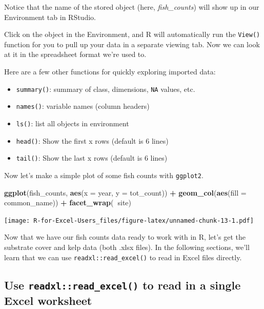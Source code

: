 \documentclass[]{book}
\newenvironment{Shaded}{\begin{snugshade}}{\end{snugshade}}
\newcommand{\DataTypeTok}[1]{\textcolor[rgb]{0.13,0.29,0.53}{#1}}
\newcommand{\KeywordTok}[1]{\textcolor[rgb]{0.13,0.29,0.53}{\textbf{#1}}}
\newcommand{\NormalTok}[1]{#1}
\newcommand{\OperatorTok}[1]{\textcolor[rgb]{0.81,0.36,0.00}{\textbf{#1}}}
\newcommand{\StringTok}[1]{\textcolor[rgb]{0.31,0.60,0.02}{#1}}
\providecommand{\tightlist}{%
  \setlength{\itemsep}{0pt}\setlength{\parskip}{0pt}}
\begin{document}
Notice that the name of the stored object (here, \emph{fish\_counts}) will show up in our Environment tab in RStudio.

Click on the object in the Environment, and R will automatically run the \texttt{View()} function for you to pull up your data in a separate viewing tab. Now we can look at it in the spreadsheet format we're used to.

Here are a few other functions for quickly exploring imported data:

\begin{itemize}
\tightlist
\item
  \texttt{summary()}: summary of class, dimensions, \texttt{NA} values, etc.
\item
  \texttt{names()}: variable names (column headers)
\item
  \texttt{ls()}: list all objects in environment
\item
  \texttt{head()}: Show the first x rows (default is 6 lines)
\item
  \texttt{tail()}: Show the last x rows (default is 6 lines)
\end{itemize}

Now let's make a simple plot of some fish counts with \texttt{ggplot2}.

\begin{Shaded}
\begin{Highlighting}[]
\KeywordTok{ggplot}\NormalTok{(fish_counts, }\KeywordTok{aes}\NormalTok{(}\DataTypeTok{x =}\NormalTok{ year, }\DataTypeTok{y =}\NormalTok{ tot_count)) }\OperatorTok{+}
\StringTok{  }\KeywordTok{geom_col}\NormalTok{(}\KeywordTok{aes}\NormalTok{(}\DataTypeTok{fill =}\NormalTok{ common_name)) }\OperatorTok{+}
\StringTok{  }\KeywordTok{facet_wrap}\NormalTok{(}\OperatorTok{~}\NormalTok{site)}
\end{Highlighting}
\end{Shaded}

\texttt{[image: R-for-Excel-Users\_files/figure-latex/unnamed-chunk-13-1.pdf]}

Now that we have our fish counts data ready to work with in R, let's get the substrate cover and kelp data (both .xlsx files). In the following sections, we'll learn that we can use \texttt{readxl::read\_excel()} to read in Excel files directly.

\hypertarget{use-readxlread_excel-to-read-in-a-single-excel-worksheet}{%
\subsection{\texorpdfstring{Use \texttt{readxl::read\_excel()} to read in a single Excel worksheet}{Use readxl::read\_excel() to read in a single Excel worksheet}}\label{use-readxlread_excel-to-read-in-a-single-excel-worksheet}}
\end{document}
